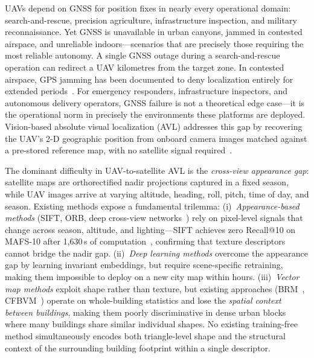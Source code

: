 \documentclass[10pt]{article}
\theoremstyle{plain}
\theoremstyle{definition}
\begin{document}
UAVs depend on GNSS for position fixes in nearly every operational domain:
search-and-rescue, precision agriculture, infrastructure inspection, and
military reconnaissance.
Yet GNSS is unavailable in urban canyons, jammed in contested airspace, and
unreliable indoors---scenarios that are precisely those requiring the most
reliable autonomy.
A single GNSS outage during a search-and-rescue operation can redirect a UAV
kilometres from the target zone.
In contested airspace, GPS jamming has been documented to deny localization
entirely for extended periods~\cite{murrian2021gnss,dovis2015gnss}.
For emergency responders, infrastructure inspectors, and autonomous delivery
operators, GNSS failure is not a theoretical edge case---it is the operational
norm in precisely the environments these platforms are deployed.
Vision-based absolute visual localization (AVL) addresses this gap by
recovering the UAV's 2-D geographic position from onboard camera images matched
against a pre-stored reference map, with no satellite signal
required~\cite{couturier2021review,ouyang2024cfbvm}.

The dominant difficulty in UAV-to-satellite AVL is the \emph{cross-view
appearance gap}: satellite maps are orthorectified nadir projections captured
in a fixed season, while UAV images arrive at varying altitude, heading, roll,
pitch, time of day, and season.
Existing methods expose a fundamental trilemma:
(i)~\emph{Appearance-based methods} (SIFT, ORB, deep cross-view
networks~\cite{goforth2019gps,fan2024sspt}) rely on pixel-level signals that
change across season, altitude, and lighting---SIFT achieves zero Recall@10 on
MAFS-10 after 1,630\,s of computation~\cite{yuan2025swapf},
confirming that texture descriptors cannot bridge the nadir gap.
(ii)~\emph{Deep learning methods} overcome the appearance gap by learning
invariant embeddings, but require scene-specific retraining, making them
impossible to deploy on a new city map within hours.
(iii)~\emph{Vector map methods} exploit shape rather than texture, but existing
approaches (BRM~\cite{choi2020brm}, CFBVM~\cite{ouyang2024cfbvm}) operate on
whole-building statistics and lose the \emph{spatial context between buildings},
making them poorly discriminative in dense urban blocks where many buildings
share similar individual shapes.
No existing training-free method simultaneously encodes both triangle-level
shape and the structural context of the surrounding building footprint within
a single descriptor.
\end{document}
